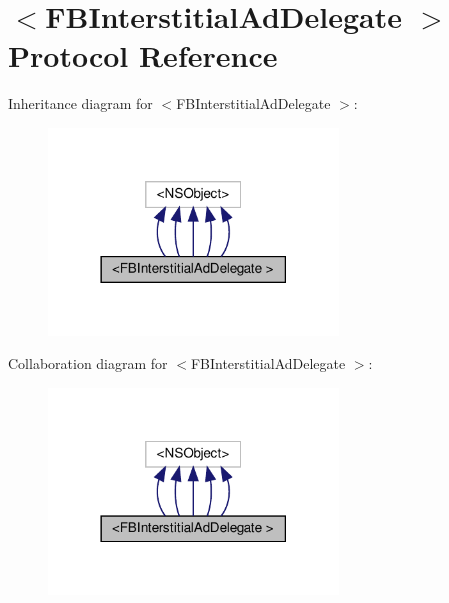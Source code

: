 \hypertarget{protocolFBInterstitialAdDelegate_01-p}{}\section{$<$F\+B\+Interstitial\+Ad\+Delegate $>$ Protocol Reference}
\label{protocolFBInterstitialAdDelegate_01-p}


Inheritance diagram for $<$F\+B\+Interstitial\+Ad\+Delegate $>$\+:
\nopagebreak
\begin{figure}[H]
\begin{center}
\leavevmode
\includegraphics[width=218pt]{protocolFBInterstitialAdDelegate_01-p__inherit__graph}
\end{center}
\end{figure}


Collaboration diagram for $<$F\+B\+Interstitial\+Ad\+Delegate $>$\+:
\nopagebreak
\begin{figure}[H]
\begin{center}
\leavevmode
\includegraphics[width=218pt]{protocolFBInterstitialAdDelegate_01-p__coll__graph}
\end{center}
\end{figure}
